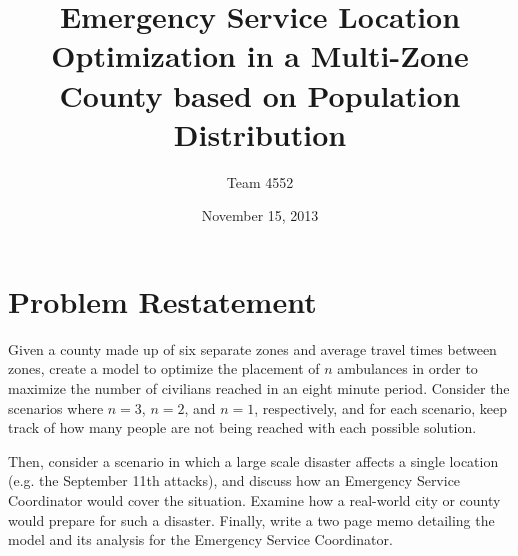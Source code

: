 \documentclass[notitlepage, 12pt]{article}
\title{\textbf{Emergency Service Location Optimization in a Multi-Zone County based on Population Distribution}}
\author{Team 4552}
\date{November 15, 2013}
\begin{document}
\maketitle

\tableofcontents
\newpage
\section{Problem Restatement}
Given a county made up of six separate zones and average travel times between zones, create a model to optimize the placement of $n$ ambulances in order to maximize the number of civilians reached in an eight minute period. Consider the scenarios where $n = 3$, $n = 2$, and $n = 1$, respectively, and for each scenario, keep track of how many people are not being reached with each possible solution.

Then, consider a scenario in which a large scale disaster affects a single location (e.g. the September 11th attacks), and discuss how an Emergency Service Coordinator would cover the situation. Examine how a real-world city or county would prepare for such a disaster. Finally, write a two page memo detailing the model and its analysis for the Emergency Service Coordinator.
\end{document}
